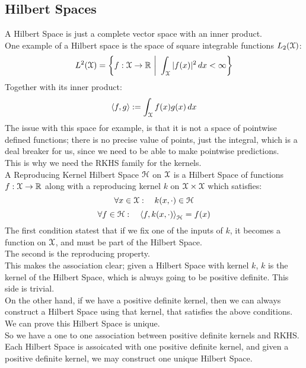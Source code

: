 \documentclass[12pt]{article}
\begin{document}
\newpage

\subsection*{Hilbert Spaces}

A Hilbert Space is just a complete vector space with
an inner product. \\

One example of a Hilbert space is the 
space of square integrable functions $L_2(\mathcal{X})$:
\[ L^2(\xcal) = \left\{ f : \xcal \to \mathbb{R} \ \bigg| 
\ \int_\xcal |f(x)|^2 \, dx < \infty \right\} \]
Together with its inner product:
\[ \langle f, g \rangle := \int_{\mathcal{X}} f(x) g(x) \, dx \]
The issue with this space for example,
is that it is not a space of pointwise defined 
functions; there is no precise value 
of points, just the integral, which is a deal breaker
for us, since we need to be able to make
pointwise predictions. \\

This is why we need the RKHS family for the
kernels. \\

A Reproducing Kernel Hilbert Space $\mathcal{H}$
on $\mathcal{X}$ is a Hilbert Space of functions
$f: \mathcal{X} \to \mathbb{R}$ along with a reproducing kernel
$k$ on $\mathcal{X} \times \mathcal{X}$ which satisfies:
\[ \forall x \in \mathcal{X}: \quad k(x, \cdot) \in \mathcal{H} \]
\[ \forall f \in \mathcal{H}: \quad 
\left\langle f, k(x, \cdot) \right\rangle_{\mathcal{H}} = f(x) \]
The first condition statest that
if we fix one of the inputs of $k$,
it becomes a function on $\mathcal{X}$, and must
be part of the Hilbert Space. \\
The second is the reproducing property. \\

This makes the association clear;
given a Hilbert Space with kernel $k$,
$k$ is the kernel of the Hilbert Space,
which is always going to be positive definite. 
This side is trivial. \\
On the other hand, if we have a positive definite
kernel, then we can always construct a Hilbert
Space using that kernel, that satisfies the
above conditions. We can prove this
Hilbert Space is unique. \\

So we have a one to one association between
positive definite kernels and RKHS. \\
Each Hilbert Space is assoicated with one positive
definite kernel, and given a positive definite
kernel, we may construct one unique Hilbert Space. \\
\end{document}
